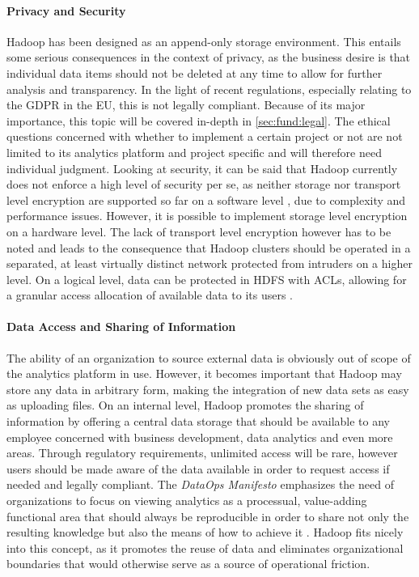 \paragraph{Privacy and Security}
Hadoop has been designed as an append-only storage environment. 
This entails some serious consequences in the context of privacy, as the business desire is that individual data items should not be deleted at any time to allow for further analysis and transparency. 
In the light of recent regulations, especially relating to the \ac{GDPR} in the \ac{EU}, this is not legally compliant. 
Because of its major importance, this topic will be covered in-depth in \vref{sec:fund:legal}. The ethical questions concerned with whether to implement a certain project or not are not limited to its analytics platform and project specific and will therefore need individual judgment. 
Looking at security, it can be said that Hadoop currently does not enforce a high level of security per se, 
as neither storage nor transport level encryption are supported so far on a software level \autocite[p.~82]{rajasekar2015survey}, due to complexity and performance issues. 
However, it is possible to implement storage level encryption on a hardware level. The lack of transport level encryption however has to be noted and leads to the consequence that Hadoop clusters should be operated in a separated, 
at least virtually distinct network protected from intruders on a higher level.
On a logical level, data can be protected in \ac{HDFS} with \acp{ACL}, allowing for a granular access allocation of available data to its users \autocite{hdfspermissions}.


\paragraph{Data Access and Sharing of Information}
The ability of an organization to source external data is obviously out of scope of the analytics platform in use. However, it becomes important that Hadoop may store any data in arbitrary form, making the integration of new data sets as easy as uploading files. On an internal level, Hadoop promotes the sharing of information by offering a central data storage that should be available to any employee concerned with business development, data analytics and even more areas. Through regulatory requirements, unlimited access will be rare, however users should be made aware of the data available in order to request access if needed and legally compliant. The \emph{DataOps Manifesto} emphasizes the need of organizations to focus on viewing analytics as a processual, value-adding functional area that should always be reproducible in order to share not only the resulting knowledge but also the means of how to achieve it \autocite[][§11, §14, §17]{dataopsmanifesto}. Hadoop fits nicely into this concept, as it promotes the reuse of data and eliminates organizational boundaries that would otherwise serve as a source of operational friction.

